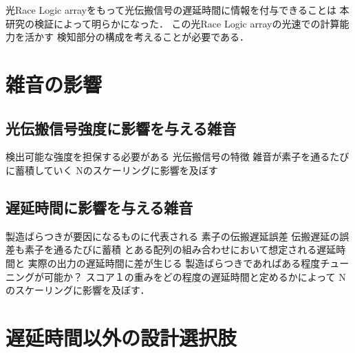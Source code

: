 光Race Logic arrayをもって光伝搬信号の遅延時間に情報を付与できることは
本研究の検証によって明らかになった．
この光Race Logic arrayの光速での計算能力を活かす
検知部分の構成を考えることが必要である．

\section{雑音の影響}
\subsection{光伝搬信号強度に影響を与える雑音}
検出可能な強度を担保する必要がある
光伝搬信号の特徴
雑音が素子を通るたびに蓄積していく
Nのスケーリングに影響を及ぼす
\subsection{遅延時間に影響を与える雑音}
製造ばらつきが要因になるものに代表される
素子の伝搬遅延誤差
伝搬遅延の誤差も素子を通るたびに蓄積
とある配列の組み合わせにおいて想定される遅延時間と
実際の出力の遅延時間に差が生じる
製造ばらつきであればある程度チューニングが可能か？
スコア１の重みをどの程度の遅延時間と定めるかによって
Nのスケーリングに影響を及ぼす．

\section{遅延時間以外の設計選択肢}
